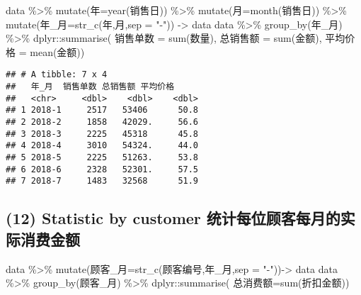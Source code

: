 \documentclass[
]{article}
\newenvironment{Shaded}{\begin{snugshade}}{\end{snugshade}}
\newcommand{\AttributeTok}[1]{\textcolor[rgb]{0.77,0.63,0.00}{#1}}
\newcommand{\FunctionTok}[1]{\textcolor[rgb]{0.00,0.00,0.00}{#1}}
\newcommand{\NormalTok}[1]{#1}
\newcommand{\OtherTok}[1]{\textcolor[rgb]{0.56,0.35,0.01}{#1}}
\newcommand{\SpecialCharTok}[1]{\textcolor[rgb]{0.00,0.00,0.00}{#1}}
\newcommand{\StringTok}[1]{\textcolor[rgb]{0.31,0.60,0.02}{#1}}
\begin{document}
\begin{Shaded}
\begin{Highlighting}[]
\NormalTok{data }\SpecialCharTok{\%\textgreater{}\%} 
  \FunctionTok{mutate}\NormalTok{(年}\OtherTok{=}\FunctionTok{year}\NormalTok{(销售日)) }\SpecialCharTok{\%\textgreater{}\%} 
  \FunctionTok{mutate}\NormalTok{(月}\OtherTok{=}\FunctionTok{month}\NormalTok{(销售日)) }\SpecialCharTok{\%\textgreater{}\%} 
  \FunctionTok{mutate}\NormalTok{(年\_月}\OtherTok{=}\FunctionTok{str\_c}\NormalTok{(年,月,}\AttributeTok{sep =} \StringTok{"{-}"}\NormalTok{)) }\OtherTok{{-}\textgreater{}}\NormalTok{ data}
\NormalTok{data }\SpecialCharTok{\%\textgreater{}\%} 
  \FunctionTok{group\_by}\NormalTok{(年\_月) }\SpecialCharTok{\%\textgreater{}\%} 
\NormalTok{  dplyr}\SpecialCharTok{::}\FunctionTok{summarise}\NormalTok{(}
\NormalTok{    销售单数 }\OtherTok{=} \FunctionTok{sum}\NormalTok{(数量),}
\NormalTok{    总销售额 }\OtherTok{=} \FunctionTok{sum}\NormalTok{(金额),}
\NormalTok{    平均价格 }\OtherTok{=} \FunctionTok{mean}\NormalTok{(金额)) }
\end{Highlighting}
\end{Shaded}

\begin{verbatim}
## # A tibble: 7 x 4
##   年_月  销售单数 总销售额 平均价格
##   <chr>     <dbl>    <dbl>    <dbl>
## 1 2018-1     2517   53406      50.8
## 2 2018-2     1858   42029.     56.6
## 3 2018-3     2225   45318      45.8
## 4 2018-4     3010   54324.     44.0
## 5 2018-5     2225   51263.     53.8
## 6 2018-6     2328   52301.     57.5
## 7 2018-7     1483   32568      51.9
\end{verbatim}

\hypertarget{statistic-by-customer-ux7edfux8ba1ux6bcfux4f4dux987eux5ba2ux6bcfux6708ux7684ux5b9eux9645ux6d88ux8d39ux91d1ux989d}{%
\subsection{(12) Statistic by customer
统计每位顾客每月的实际消费金额}\label{statistic-by-customer-ux7edfux8ba1ux6bcfux4f4dux987eux5ba2ux6bcfux6708ux7684ux5b9eux9645ux6d88ux8d39ux91d1ux989d}}

\begin{Shaded}
\begin{Highlighting}[]
\NormalTok{data }\SpecialCharTok{\%\textgreater{}\%} 
  \FunctionTok{mutate}\NormalTok{(顾客\_月}\OtherTok{=}\FunctionTok{str\_c}\NormalTok{(顾客编号,年\_月,}\AttributeTok{sep =} \StringTok{"{-}"}\NormalTok{))}\OtherTok{{-}\textgreater{}}\NormalTok{ data}
\NormalTok{data }\SpecialCharTok{\%\textgreater{}\%} 
  \FunctionTok{group\_by}\NormalTok{(顾客\_月) }\SpecialCharTok{\%\textgreater{}\%} 
\NormalTok{  dplyr}\SpecialCharTok{::}\FunctionTok{summarise}\NormalTok{(}
\NormalTok{    总消费额}\OtherTok{=}\FunctionTok{sum}\NormalTok{(折扣金额))}
\end{Highlighting}
\end{Shaded}
\end{document}
